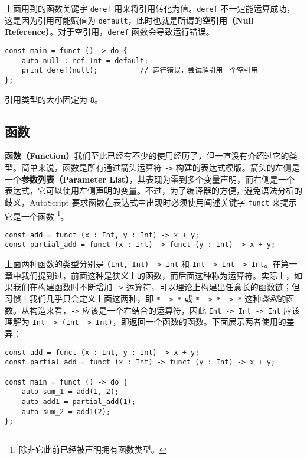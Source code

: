 上面用到的函数关键字 \lstinline!deref! 用来将引用转化为值。\lstinline!deref! 不一定能运算成功，这是因为引用可能赋值为 \lstinline!default!，此时也就是所谓的\textbf{空引用（Null Reference）}。对于空引用，\lstinline!deref! 函数会导致运行错误。

\begin{lstlisting}
const main = funct () -> do {
    auto null : ref Int = default;
    print deref(null);          // 运行错误，尝试解引用一个空引用
};
\end{lstlisting}

引用类型的大小固定为 \lstinline!8!。


\subsection{函数}

\textbf{函数（Function）}我们至此已经有不少的使用经历了，但一直没有介绍过它的类型。简单来说，函数是所有通过箭头运算符 \lstinline!->! 构建的表达式模版。箭头的左侧是一个\textbf{参数列表（Parameter List）}，其表现为零到多个变量声明，而右侧是一个表达式，它可以使用左侧声明的变量。不过，为了编译器的方便，避免语法分析的歧义，AutoScript 要求函数在表达式中出现时必须使用阐述关键字 \lstinline!funct! 来提示它是一个函数 \footnote{除非它此前已经被声明拥有函数类型。}。

\begin{lstlisting}
const add = funct (x : Int, y : Int) -> x + y;
const partial_add = funct (x : Int) -> funct (y : Int) -> x + y;
\end{lstlisting}

上面两种函数的类型分别是 \lstinline!(Int, Int) -> Int! 和 \lstinline!Int -> Int -> Int!。在第一章中我们提到过，前面这种是狭义上的函数，而后面这种称为运算符。实际上，如果我们在构建函数时不断增加 \lstinline!->! 运算符，可以理论上构建出任意长的函数链；但习惯上我们几乎只会定义上面这两种，即 \lstinline!* -> *! 或 \lstinline!* -> * -> *! 这种\emph{类别}的函数。从构造来看，\lstinline!->! 应该是一个右结合的运算符，因此 \lstinline!Int -> Int -> Int! 应该理解为 \lstinline!Int -> (Int -> Int)!，即返回一个函数的函数。下面展示两者使用的差异：

\begin{lstlisting}
const add = funct (x : Int, y : Int) -> x + y;
const partial_add = funct (x : Int) -> funct (y : Int) -> x + y;

const main = funct () -> do {
    auto sum_1 = add(1, 2);
    auto add1 = partial_add(1);
    auto sum_2 = add1(2);
};
\end{lstlisting}

